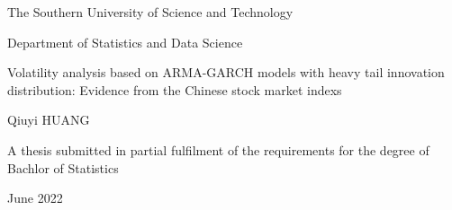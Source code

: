\thispagestyle{empty}
\begin{center}
\Large

The Southern University of Science and Technology

Department of Statistics and Data Science

Volatility analysis based on ARMA-GARCH models with heavy tail innovation distribution: Evidence from the Chinese stock market indexs

Qiuyi HUANG

A thesis submitted in partial fulfilment of the requirements for the degree of Bachlor of Statistics

June 2022
\end{center}